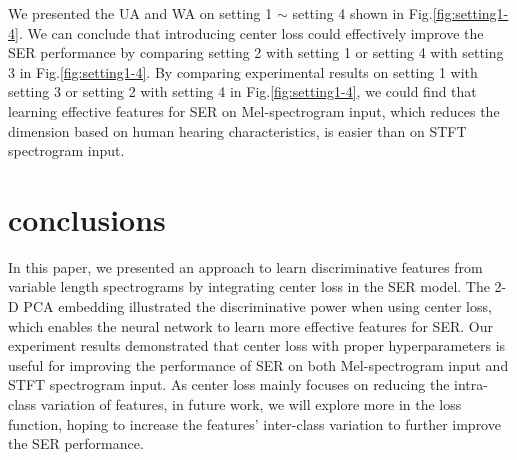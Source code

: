 \documentclass{article}
\begin{document}
We presented the UA and WA on setting 1 $\sim$ setting 4 shown in Fig.\ref{fig:setting1-4}. We can conclude that introducing center loss could effectively improve the SER performance by comparing setting 2 with setting 1 or setting 4 with setting 3 in Fig.\ref{fig:setting1-4}.  By comparing experimental results on setting 1 with setting 3 or setting 2 with setting 4 in Fig.\ref{fig:setting1-4}, we could find that learning effective features for SER on Mel-spectrogram input, which reduces the dimension based on human hearing characteristics, is easier than on STFT spectrogram input.

\section{conclusions}
In this paper, we presented an approach to learn discriminative features from variable length spectrograms by integrating center loss in the SER model. The 2-D PCA embedding illustrated the discriminative power when using center loss, which enables the neural network to learn more effective features for SER. Our experiment results demonstrated that center loss with proper hyperparameters is useful for improving the performance of SER on both Mel-spectrogram input and STFT spectrogram input. As center loss mainly focuses on reducing the intra-class variation of features, in future work, we will explore more in the loss function, hoping to increase the features' inter-class variation to further improve the SER performance. 

\vfill\pagebreak
								




\end{document}
